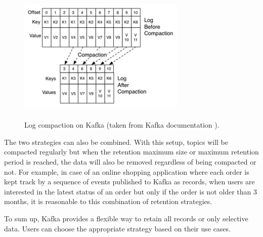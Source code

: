 \begin{figure}[h]
	\centering
	\includegraphics[width=8cm,height=6.5cm]{images/compact-kafka.png}
	\caption{Log compaction on Kafka (taken from Kafka documentation \cite{kafkadocumentation}).}
	\label{fig:compactekafka}
\end{figure}

The two strategies can also be combined. With this setup, topics will be compacted regularly but when the retention maximum size or maximum retention period is reached, the data will also be removed regardless of being compacted or not. For example, in case of an online shopping application where each order is kept track by a sequence of events published to Kafka as records, when users are interested in the latest status of an order but only if the order is not older than 3 months, it is reasonable to this combination of retention strategies.

To sum up, Kafka provides a flexible way to retain all records or only selective data. Users can choose the appropriate strategy based on their use cases. 





